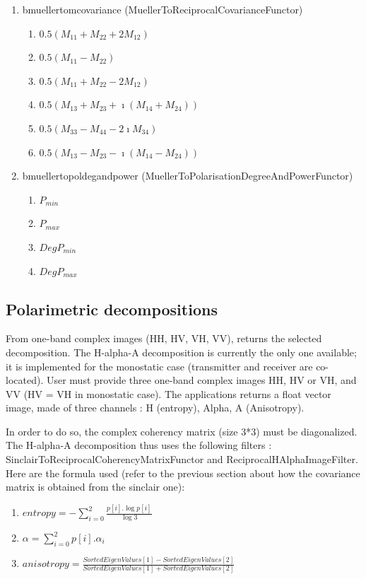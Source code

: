 \begin{enumerate}
\item bmuellertomcovariance (MuellerToReciprocalCovarianceFunctor)
\begin{enumerate}
\item $ 0.5 (M_{11} + M_{22} + 2 M_{12}) $ 
\item $ 0.5 (M_{11} - M_{22}) $ 
\item $ 0.5 (M_{11} + M_{22} - 2 M_{12}) $ 
\item $ 0.5 (M_{13} + M_{23} + \imath (M_{14}+M_{24})) $ 
\item $ 0.5 (M_{33} - M_{44} - 2 \imath M_{34}) $ 
\item $ 0.5 (M_{13} - M_{23} - \imath (M_{14}-M_{24})) $
\end{enumerate}
 
\item bmuellertopoldegandpower (MuellerToPolarisationDegreeAndPowerFunctor)
\begin{enumerate}
\item $ P_{min} $ 
\item $ P_{max} $ 
\item $ DegP_{min} $ 
\item $ DegP_{max} $
\end{enumerate}

\end{enumerate}

\subsection{Polarimetric decompositions}\label{ssec:poldecomp}

From one-band complex images (HH, HV, VH, VV), returns the selected decomposition.
The H-alpha-A decomposition is currently the only one available; it is implemented for the monostatic case (transmitter and receiver are co-located).
User must provide three one-band complex images HH, HV or VH, and VV (HV = VH in monostatic case).
The applications returns a float vector image, made of three channels : H (entropy), Alpha, A (Anisotropy).

In order to do so, the complex coherency matrix (size 3*3) must be diagonalized.
The H-alpha-A decomposition thus uses the following filters : SinclairToReciprocalCoherencyMatrixFunctor and ReciprocalHAlphaImageFilter.
Here are the formula used (refer to the previous section about how the covariance matrix is obtained from the sinclair one):
\begin{enumerate}
\renewcommand{\labelenumi}{Channel \arabic{enumi} : }
\item $ entropy = -\sum_{i=0}^{2} \frac{p[i].\log{p[i]}}{\log{3}} $
\item $ \alpha = \sum_{i=0}^{2} p[i].\alpha_{i} $
\item $ anisotropy = \frac {SortedEigenValues[1] - SortedEigenValues[2]}{SortedEigenValues[1] + SortedEigenValues[2]} $
\end{enumerate}

